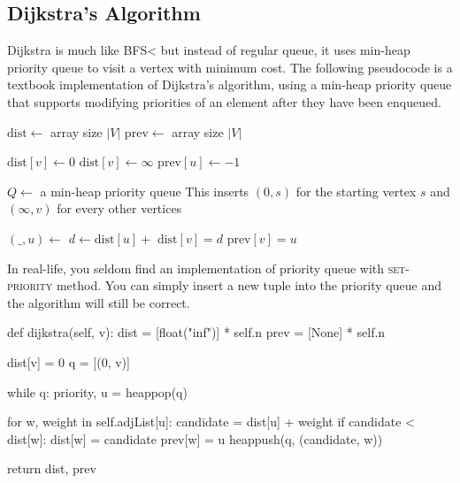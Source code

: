 \subsection{Dijkstra's Algorithm}

\noindent Dijkstra is much like BFS< but instead of regular queue, it uses min-heap priority queue to visit a vertex with minimum cost.
The following pseudocode is a textbook implementation of Dijkstra's algorithm, using a min-heap priority queue that supports modifying priorities of an element after they have been enqueued.

\noindent \hrulefill
\begin{algorithmic}[1]
   
    \State $\mathrm{dist} \gets$ array size $|V|$
    \State $\mathrm{prev} \gets$ array size $|V|$

        $\mathrm{dist}[v] \gets 0$
      \EndIf
        $\mathrm{dist}[v] \gets \infty$
      \EndIf
      \State $\mathrm{prev}[u] \gets -1$
    \EndFor
  \item[]
    \State $Q \gets$ a min-heap priority queue
      \LComment This inserts $(0, s)$ for the starting vertex $s$ and $(\infty, v)$ for every other vertices
      \State {}
    \EndFor
  \item[]
    \State $(\textrm{\_}, u) \gets$ 
      \State $d \gets \textrm{dist}[u] +$ 
        \State $\textrm{dist}[v] = d$
        \State $\textrm{prev}[v] = u$
        \State {}
      \EndIf
    \EndFor
    \EndWhile
  \EndFunction
\end{algorithmic}
\noindent \hrulefill

\noindent In real-life, you seldom find an implementation of priority queue with \textsc{set-priority} method.
You can simply insert a new tuple into the priority queue and the algorithm will still be correct.

\begin{python}
    def dijkstra(self, v):
        dist = [float("inf")] * self.n
        prev = [None] * self.n

        dist[v] = 0
        q = [(0, v)]

        while q:
            priority, u = heappop(q)

            for w, weight in self.adjList[u]:
                candidate = dist[u] + weight
                if candidate < dist[w]:
                    dist[w] = candidate
                    prev[w] = u
                    heappush(q, (candidate, w))

        return dist, prev
\end{python}

